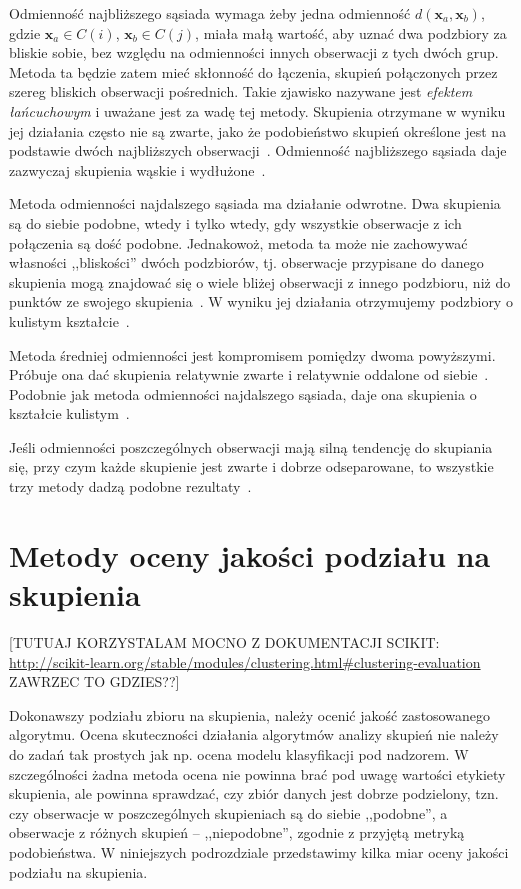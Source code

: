 \documentclass{praca1}
\begin{document}
Odmienność najbliższego sąsiada wymaga żeby jedna odmienność $d(\mathbf{x}_a, \mathbf{x}_b)$, gdzie $\mathbf{x}_a \in C(i)$, $\mathbf{x}_b \in C(j)$, miała małą wartość, aby uznać dwa podzbiory za bliskie sobie, bez względu na odmienności innych obserwacji z tych dwóch grup. Metoda ta będzie zatem mieć skłonność do łączenia, skupień połączonych przez szereg bliskich obserwacji pośrednich. Takie zjawisko nazywane jest \emph{efektem łańcuchowym} i uważane jest za wadę tej metody. Skupienia otrzymane w wyniku jej działania często nie są zwarte, jako że podobieństwo skupień określone jest na podstawie dwóch najbliższych obserwacji~\cite{Hastie2009:elements}. Odmienność najbliższego sąsiada daje zazwyczaj skupienia wąskie i wydłużone~\cite{Koronacki2005:statystyczne}. 

Metoda odmienności najdalszego sąsiada ma działanie odwrotne. Dwa skupienia są do siebie podobne, wtedy i tylko wtedy, gdy wszystkie obserwacje z ich połączenia są dość podobne. Jednakowoż, metoda ta może nie zachowywać własności ,,bliskości'' dwóch podzbiorów, tj. obserwacje przypisane do danego skupienia mogą znajdować się o wiele bliżej obserwacji z innego podzbioru, niż do punktów ze swojego skupienia~\cite{Hastie2009:elements}. W wyniku jej działania otrzymujemy podzbiory o kulistym kształcie~\cite{Koronacki2005:statystyczne}.

Metoda średniej odmienności jest kompromisem pomiędzy dwoma powyższymi. Próbuje ona dać skupienia relatywnie zwarte i relatywnie oddalone od siebie~\cite{Hastie2009:elements}. Podobnie jak metoda odmienności najdalszego sąsiada, daje ona skupienia o kształcie kulistym~\cite{Koronacki2005:statystyczne}.

Jeśli odmienności poszczególnych obserwacji mają silną tendencję do skupiania się, przy czym każde skupienie jest zwarte i dobrze odseparowane, to wszystkie trzy metody dadzą podobne rezultaty~\cite{Hastie2009:elements}.

\section{Metody oceny jakości podziału na skupienia}

[TUTUAJ KORZYSTALAM MOCNO Z DOKUMENTACJI SCIKIT: \url{http://scikit-learn.org/stable/modules/clustering.html#clustering-evaluation}  ZAWRZEC TO GDZIES??]

Dokonawszy podziału zbioru na skupienia, należy ocenić jakość zastosowanego algorytmu. Ocena skuteczności działania algorytmów analizy skupień nie należy do zadań tak prostych jak np. ocena modelu klasyfikacji pod nadzorem. W szczególności żadna metoda ocena nie powinna brać pod uwagę wartości etykiety skupienia, ale powinna sprawdzać, czy zbiór danych jest dobrze podzielony, tzn. czy obserwacje w poszczególnych skupieniach są do siebie ,,podobne'', a obserwacje z różnych skupień -- ,,niepodobne'', zgodnie z przyjętą metryką podobieństwa. W niniejszych podrozdziale przedstawimy kilka miar oceny jakości podziału na skupienia.
\end{document}
